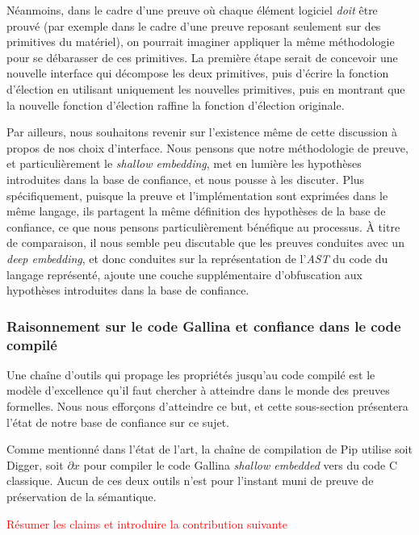 Néanmoins, dans le cadre d'une preuve où chaque élément logiciel \emph{doit} être prouvé (par exemple dans le cadre d'une preuve reposant seulement sur des primitives du matériel), on pourrait imaginer appliquer la même méthodologie pour se débarasser de ces primitives. La première étape serait de concevoir une nouvelle interface qui décompose les deux primitives, puis d'écrire la fonction d'élection en utilisant uniquement les nouvelles primitives, puis en montrant que la nouvelle fonction d'élection raffine la fonction d'élection originale.

Par ailleurs, nous souhaitons revenir sur l'existence même de cette discussion à propos de nos choix d'interface. Nous pensons que notre méthodologie de preuve, et particulièrement le \emph{shallow embedding}, met en lumière les hypothèses introduites dans la base de confiance, et nous pousse à les discuter. Plus spécifiquement, puisque la preuve et l'implémentation sont exprimées dans le même langage, ils partagent la même définition des hypothèses de la base de confiance, ce que nous pensons particulièrement bénéfique au processus. À titre de comparaison, il nous semble peu discutable que les preuves conduites avec un \emph{deep embedding}, et donc conduites sur la représentation de l'\emph{AST} du code du langage représenté, ajoute une couche supplémentaire d'obfuscation aux hypothèses introduites dans la base de confiance.

\subsubsection{Raisonnement sur le code Gallina et confiance dans le code compilé}

Une chaîne d'outils qui propage les propriétés jusqu'au code compilé est le modèle d'excellence qu'il faut chercher à atteindre dans le monde des preuves formelles. Nous nous efforçons d'atteindre ce but, et cette sous-section présentera l'état de notre base de confiance sur ce sujet.

Comme mentionné dans l'état de l'art, la chaîne de compilation de Pip utilise soit Digger, soit $\partial x$ pour compiler le code Gallina \emph{shallow embedded} vers du code C classique. Aucun de ces deux outils n'est pour l'instant muni de preuve de préservation de la sémantique.

		\textcolor{red}{Résumer les claims et introduire la contribution suivante}
